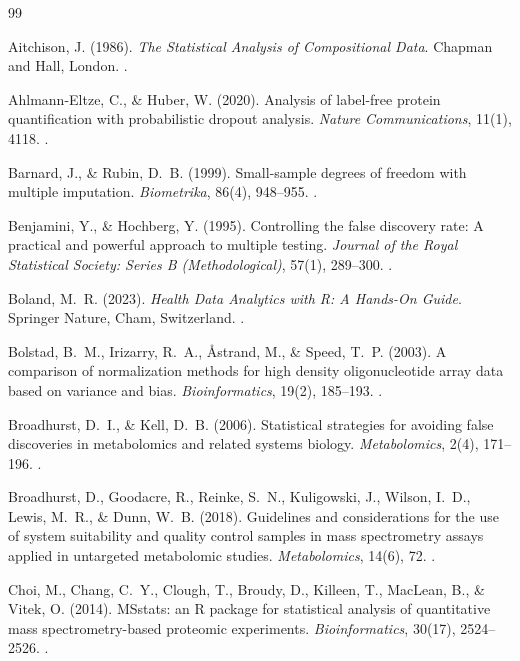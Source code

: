 \documentclass[11pt,oneside]{book}
\begin{document}

\begin{thebibliography}{99}

Aitchison, J. (1986). \textit{The Statistical Analysis of Compositional Data}. Chapman and Hall, London. .

Ahlmann-Eltze, C., \& Huber, W. (2020). Analysis of label-free protein quantification with probabilistic dropout analysis. \textit{Nature Communications}, 11(1), 4118. .

Barnard, J., \& Rubin, D.~B. (1999). Small-sample degrees of freedom with multiple imputation. \textit{Biometrika}, 86(4), 948--955. .

Benjamini, Y., \& Hochberg, Y. (1995). Controlling the false discovery rate: A practical and powerful approach to multiple testing. \textit{Journal of the Royal Statistical Society: Series B (Methodological)}, 57(1), 289--300. .

Boland, M.~R. (2023). \textit{Health Data Analytics with R: A Hands-On Guide}. Springer Nature, Cham, Switzerland. .

Bolstad, B.~M., Irizarry, R.~A., {\AA}strand, M., \& Speed, T.~P. (2003). A comparison of normalization methods for high density oligonucleotide array data based on variance and bias. \textit{Bioinformatics}, 19(2), 185--193. .

Broadhurst, D.~I., \& Kell, D.~B. (2006). Statistical strategies for avoiding false discoveries in metabolomics and related systems biology. \textit{Metabolomics}, 2(4), 171--196. .

Broadhurst, D., Goodacre, R., Reinke, S.~N., Kuligowski, J., Wilson, I.~D., Lewis, M.~R., \& Dunn, W.~B. (2018). Guidelines and considerations for the use of system suitability and quality control samples in mass spectrometry assays applied in untargeted metabolomic studies. \textit{Metabolomics}, 14(6), 72. .

Choi, M., Chang, C.~Y., Clough, T., Broudy, D., Killeen, T., MacLean, B., \& Vitek, O. (2014). MSstats: an R package for statistical analysis of quantitative mass spectrometry-based proteomic experiments. \textit{Bioinformatics}, 30(17), 2524--2526. .


\end{thebibliography}
\end{document}
